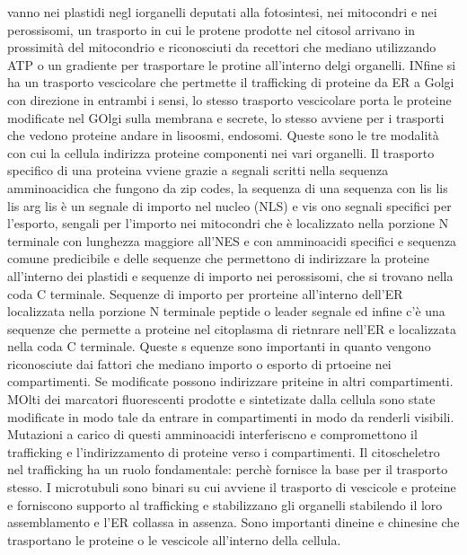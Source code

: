 vanno nei plastidi negl iorganelli deputati alla fotosintesi, nei mitocondri e nei perossisomi, un trasporto in cui le protene prodotte nel citosol arrivano in prossimit\`a del 
mitocondrio e riconosciuti da recettori che mediano utilizzando ATP o un gradiente per trasportare le protine all'interno delgi organelli. INfine si ha un trasporto vescicolare che
pertmette il trafficking di proteine da ER a Golgi con direzione in entrambi i sensi, lo stesso trasporto vescicolare porta le proteine modificate nel GOlgi sulla membrana e secrete, lo 
stesso avviene per i trasporti che vedono proteine andare in lisoosmi, endosomi. Queste sono le tre modalit\`a con cui la cellula indirizza proteine componenti nei vari organelli. 
Il trasporto specifico di una proteina vviene grazie a segnali scritti nella sequenza amminoacidica che fungono da zip codes, la sequenza di una sequenza con lis lis lis arg lis \`e un
segnale di importo nel nucleo (NLS) e vis ono segnali specifici per l'esporto, sengali per l'importo nei mitocondri che \`e localizzato nella porzione N terminale con lunghezza maggiore
all'NES e con amminoacidi specifici e sequenza comune predicibile e delle sequenze che permettono di indirizzare la proteine all'interno dei plastidi e sequenze di importo nei 
perossisomi, che si trovano nella coda C terminale. Sequenze di importo per prorteine all'interno dell'ER localizzata nella porzione N terminale peptide o leader segnale ed infine c'\`e
una sequenze che permette a proteine nel citoplasma di rietnrare nell'ER e localizzata nella coda C terminale. Queste s equenze sono importanti in quanto vengono riconosciute dai
fattori che mediano importo o esporto di prtoeine nei compartimenti. Se modificate possono indirizzare priteine in altri compartimenti. MOlti dei marcatori fluorescenti prodotte e 
sintetizate  dalla cellula sono state modificate in modo tale da entrare in compartimenti in modo da renderli visibili. Mutazioni a carico di questi amminoacidi interferiscno e 
compromettono il trafficking e l'indirizzamento di proteine verso i compartimenti. Il citoscheletro nel trafficking ha un ruolo fondamentale: perch\`e fornisce la base per il 
trasporto stesso. I microtubuli sono binari su cui avviene il trasporto di vescicole e proteine e forniscono supporto al trafficking e stabilizzano gli organelli stabilendo il loro
assemblamento e l'ER collassa in assenza. Sono importanti dineine e chinesine che trasportano le proteine o le vescicole all'interno della cellula. 
